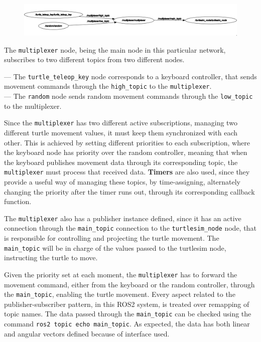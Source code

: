 \begin{figure}[H]
        \centering
         \includegraphics[width=\linewidth]{images/ts_rqt_graph.png}
\end{figure}

The \texttt{multiplexer} node, being the main node in this particular network, subscribes to two different topics from two different nodes.

--- The \texttt{turtle\_teleop\_key} node corresponds to a keyboard controller, that sends movement commands through the \texttt{high\_topic} to the \texttt{multiplexer}.\\
--- The \texttt{random} node sends random movement commands through the \texttt{low\_topic} to the multiplexer.

Since the \texttt{multiplexer} has two different active subscriptions, managing two different turtle movement values, it must keep them synchronized with each other. This is achieved by setting different priorities to each subscription, where the keyboard node has priority over the random controller, meaning that when the keyboard publishes movement data through its corresponding topic, the \texttt{multiplexer} must process that received data. \textbf{Timers} are also used, since they provide a useful way of managing these topics, by time-assigning, alternately changing the priority after the timer runs out, through its corresponding callback function.

The \texttt{multiplexer} also has a publisher instance defined, since it has an active connection through the \texttt{main\_topic} connection to the \texttt{turtlesim\_node} node, that is responsible for controlling and projecting the turtle movement. The \texttt{main\_topic} will be in charge of the values passed to the turtlesim node, instructing the turtle to move.

Given the priority set at each moment, the \texttt{multiplexer} has to forward the movement command, either from the keyboard or the random controller, through the \texttt{main\_topic}, enabling the turtle movement. Every aspect related to the publisher-subscriber pattern, in this ROS2 system, is treated over remapping of topic names. The data passed through the \texttt{main\_topic} can be checked using the command \texttt{ros2 topic echo main\_topic}. As expected, the data has both linear and angular vectors defined because of interface used.

